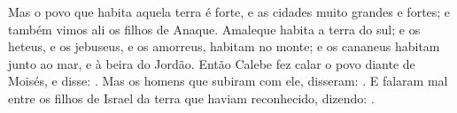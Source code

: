 {{  Mas o povo que habita aquela terra é forte, e as cidades muito grandes e fortes; e também vimos ali os filhos de Anaque.
  Amaleque habita a terra do sul; e os heteus, e os jebuseus, e os amorreus, habitam no monte; e os cananeus habitam junto ao mar, e à beira do Jordão}.
  Então Calebe fez calar o povo diante de Moisés, e disse: .
  Mas os homens que subiram com ele, disseram: .
  E falaram mal entre os filhos de Israel da terra que haviam reconhecido, dizendo: .
\par }

